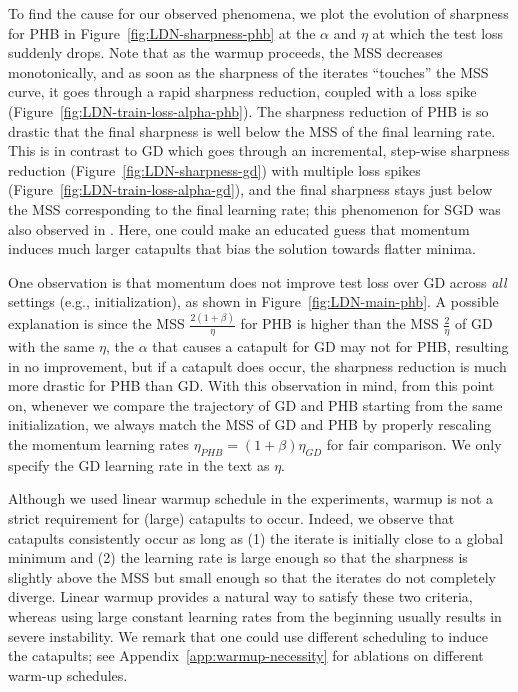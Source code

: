 To find the cause for our observed phenomena, we plot the evolution of sharpness for PHB in Figure~\ref{fig:LDN-sharpness-phb} at the $\alpha$ and $\eta$ at which the test loss suddenly drops.
Note that as the warmup proceeds, the MSS decreases monotonically, and as soon as the sharpness of the iterates ``touches'' the MSS curve, it goes through a rapid sharpness reduction, coupled with a loss spike (Figure~\ref{fig:LDN-train-loss-alpha-phb}).
The sharpness reduction of PHB is so drastic that the final sharpness is well below the MSS of the final learning rate.
This is in contrast to GD which goes through an incremental, step-wise sharpness reduction (Figure~\ref{fig:LDN-sharpness-gd}) with multiple loss spikes (Figure~\ref{fig:LDN-train-loss-alpha-gd}), and the final sharpness stays just below the MSS corresponding to the final learning rate; this phenomenon for SGD was also observed in \citet{zhu2023catapult}.
Here, one could make an educated guess that momentum induces much larger catapults that bias the solution towards flatter minima.

One observation is that momentum does not improve test loss over GD across \emph{all} settings (e.g., initialization), as shown in Figure~\ref{fig:LDN-main-phb}. A possible explanation is since the MSS $\frac{2(1+\beta)}{\eta}$ for PHB is higher than the MSS $\frac{2}{\eta}$  of GD with the same $\eta$, the $\alpha$ that causes a catapult for GD may not for PHB, resulting in no improvement, but if a catapult does occur, the sharpness reduction is much more drastic for PHB than GD. With this observation in mind, from this point on, whenever we compare the trajectory of GD and PHB starting from the same initialization, we always match the MSS of GD and PHB by properly rescaling the momentum learning rates $\eta_{PHB} = (1+\beta) \eta_{GD}$ for fair comparison. We only specify the GD learning rate in the text as $\eta$.

\begin{remark}
\label{rmk:roleofwarmup}
    Although we used linear warmup schedule in the experiments, warmup is not a strict requirement for (large) catapults to occur.
    Indeed, we observe that catapults consistently occur as long as (1) the iterate is initially close to a global minimum and (2) the learning rate is large enough so that the sharpness is slightly above the MSS but small enough so that the iterates do not completely diverge.
    Linear warmup provides a natural way to satisfy these two criteria, whereas 
    using large constant learning rates from the beginning usually results in severe instability.
    We remark that one could use different scheduling to induce the catapults; see Appendix~\ref{app:warmup-necessity} for ablations on different warm-up schedules.  
\end{remark}




